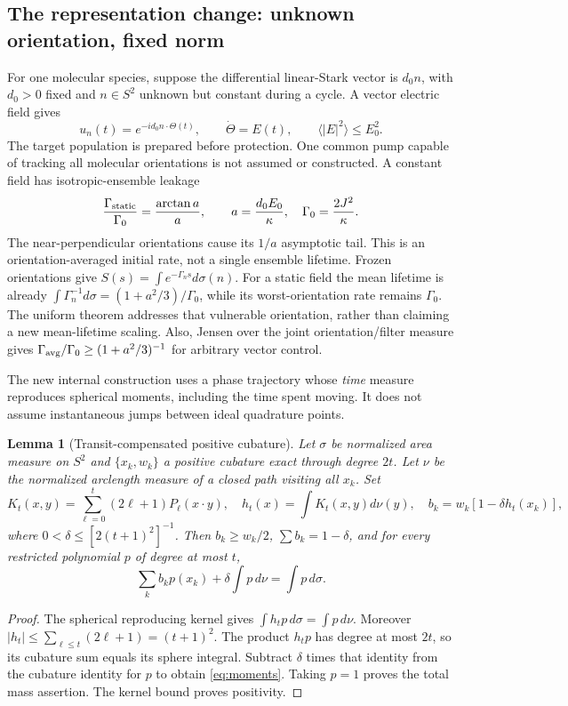 \documentclass[11pt]{article}
\newtheorem{lemma}[theorem]{Lemma}
\begin{document}
\subsection{The representation change: unknown orientation, fixed norm}

For one molecular species, suppose the differential linear-Stark vector is
$d_0n$, with $d_0>0$ fixed and $n\in S^2$ unknown but constant during a cycle.
A vector electric field gives
\[
 u_n(t)=e^{-id_0n\cdot\Theta(t)},\qquad \dot\Theta=E(t),\qquad
 \langle|E|^2\rangle\le E_0^2.
\]
The target population is prepared before protection. One common pump capable
of tracking all molecular orientations is not assumed or constructed.
A constant field has isotropic-ensemble leakage
\begin{equation}\label{eq:staticensemble}
 \frac{\Gamma_{\rm static}}{\Gamma_0}
 =\frac{\arctan a}{a},\qquad
 a=\frac{d_0E_0}{\kappa},\quad \Gamma_0=\frac{2J^2}{\kappa}.
\end{equation}
The near-perpendicular orientations cause its $1/a$ asymptotic tail.
This is an orientation-averaged initial rate, not a single ensemble lifetime.
Frozen orientations give $S(s)=\int e^{-\Gamma_ns}d\sigma(n)$.
For a static field the mean lifetime is already
$\int\Gamma_n^{-1}d\sigma=(1+a^2/3)/\Gamma_0$, while its worst-orientation
rate remains $\Gamma_0$. The uniform theorem addresses that vulnerable
orientation, rather than claiming a new mean-lifetime scaling.
Also, Jensen over the joint orientation/filter measure gives
$\Gamma_{\rm avg}/\Gamma_0\ge(1+a^2/3)^{-1}$ for arbitrary vector control.

The new internal construction uses a phase trajectory whose \emph{time}
measure reproduces spherical moments, including the time spent moving.
It does not assume instantaneous jumps between ideal quadrature points.

\begin{lemma}[Transit-compensated positive cubature]\label{lem:transit}
Let $\sigma$ be normalized area measure on $S^2$ and
$\{x_k,w_k\}$ a positive cubature exact through degree $2t$.
Let $\nu$ be the normalized arclength measure of a closed path visiting all
$x_k$. Set
\[
 K_t(x,y)=\sum_{\ell=0}^t(2\ell+1)P_\ell(x\cdot y),\quad
 h_t(x)=\int K_t(x,y)d\nu(y),\quad
 b_k=w_k[1-\delta h_t(x_k)],
\]
where $0<\delta\le[2(t+1)^2]^{-1}$. Then $b_k\ge w_k/2$,
$\sum b_k=1-\delta$, and for every restricted polynomial $p$ of degree
at most $t$,
\begin{equation}\label{eq:moments}
 \sum_k b_kp(x_k)+\delta\int p\,d\nu=\int p\,d\sigma.
\end{equation}
\end{lemma}
\begin{proof}
The spherical reproducing kernel gives
$\int h_tp\,d\sigma=\int p\,d\nu$.
Moreover $|h_t|\le\sum_{\ell\le t}(2\ell+1)=(t+1)^2$.
The product $h_tp$ has degree at most $2t$, so its cubature sum equals its
sphere integral. Subtract $\delta$ times that identity from the cubature
identity for $p$ to obtain \eqref{eq:moments}. Taking $p=1$ proves the total
mass assertion. The kernel bound proves positivity.
\end{proof}
\end{document}
